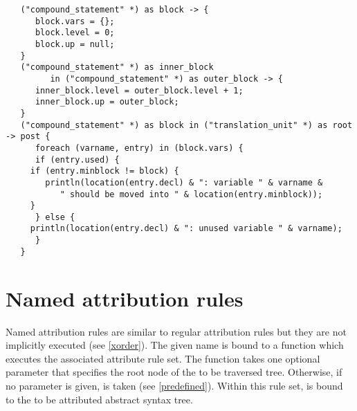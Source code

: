 \begin{lstlisting}
   ("compound_statement" *) as block -> {
      block.vars = {};
      block.level = 0;
      block.up = null;
   }
   ("compound_statement" *) as inner_block
         in ("compound_statement" *) as outer_block -> {
      inner_block.level = outer_block.level + 1;
      inner_block.up = outer_block;
   }
   ("compound_statement" *) as block in ("translation_unit" *) as root -> post {
      foreach (varname, entry) in (block.vars) {
      if (entry.used) {
	 if (entry.minblock != block) {
	    println(location(entry.decl) & ": variable " & varname &
	       " should be moved into " & location(entry.minblock));
	 }
      } else {
	 println(location(entry.decl) & ": unused variable " & varname);
      }
   }
\end{lstlisting}

\section{Named attribution rules}\label{named-atrules}

Named attribution rules are similar to regular attribution rules but
they are not implicitly executed (see \ref{xorder}). The given name
is bound to a function which executes the associated attribute rule
set. The function takes one optional parameter that specifies the
root node of the to be traversed tree. Otherwise, if no parameter is
given,  is taken (see \ref{predefined}).
Within this rule set,  is bound to the
to be attributed abstract syntax tree.

\begin{grammar}
      \produces {} 
	 \lextoken{\{} 
	 \lextoken{\}}
\end{grammar}

\endinput
